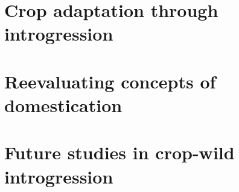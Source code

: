 \documentclass[11pt]{article}
\begin{document}
\section*{Crop adaptation through introgression}
\cite{Hufford2013} \cite{Baute2015} \cite{Bredeson2015}

\section*{Reevaluating concepts of domestication}

\section*{Future studies in crop-wild introgression}


\end{document}
